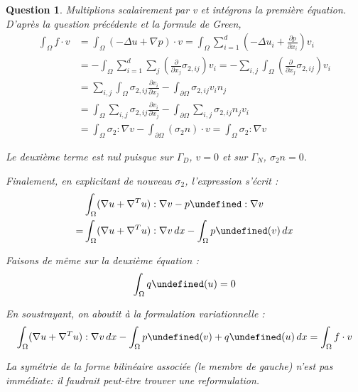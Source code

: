 \documentclass{article}
\theoremstyle{plain}
\newtheorem{ques}{Question}
\let\div\undefined
\DeclareMathOperator{\div}{div}
\let\Id\undefined
\DeclareMathOperator{\Id}{Id}
\begin{document}
\begin{ques}
Multiplions scalairement par v et intégrons la première équation. D'après la question précédente et la formule de Green,
\begin{align*}
    \int_\Omega f \cdot v  &= \int_\Omega (-\Delta u + \nabla p) \cdot v
    = \int_\Omega \sum_{i=1}^d \left(-\Delta u_i + \frac{\partial p}{\partial x_i}\right) v_i \\
    &= - \int_\Omega \sum_{i=1}^d \sum_j \left( \frac{\partial}{\partial x_j}\sigma_{2, ij} \right)  v_i
    = - \sum_{i, j} \int_\Omega \left( \frac{\partial}{\partial x_j}\sigma_{2, ij} \right)  v_i \\
    &= \sum_{i, j} \int_\Omega \sigma_{2, ij} \frac{\partial v_i}{\partial x_j} - \int_{\partial\Omega} \sigma_{2, ij} v_i n_j \\
    &= \int_\Omega \sum_{i, j} \sigma_{2, ij} \frac{\partial v_i}{\partial x_j} - \int_{\partial\Omega} \sum_{i, j} \sigma_{2, ij} n_j v_i \\
    &= \int_\Omega \sigma_2 : \nabla v - \int_{\partial\Omega} (\sigma_2 n) \cdot v
    = \int_\Omega \sigma_2 : \nabla v
\end{align*}

Le deuxième terme est nul puisque sur $\Gamma_D$, $v=0$ et sur $\Gamma_N$, $\sigma_2 n=0$. 

Finalement, en explicitant de nouveau $\sigma_2$, l'expression s'écrit :
\begin{align*}
    & \int_\Omega (\nabla u + \nabla^T u) : \nabla v - p \Id : \nabla v \\
    =& \int_\Omega (\nabla u + \nabla^T u) : \nabla v\,dx -\int_\Omega p \div(v)\,dx
\end{align*}

Faisons de même sur la deuxième équation :
\[
    \int_\Omega q \div(u) = 0
\]

En soustrayant, on aboutit à la formulation variationnelle :
\[
    \int_\Omega (\nabla u + \nabla^T u) : \nabla v\,dx 
    - \int_\Omega p \div(v) + q \div(u)\,dx
    = \int_\Omega f \cdot v
\]

La symétrie de la forme bilinéaire associée (le membre de gauche) n'est pas immédiate: il faudrait peut-être trouver une reformulation.

\end{ques}
\end{document}

